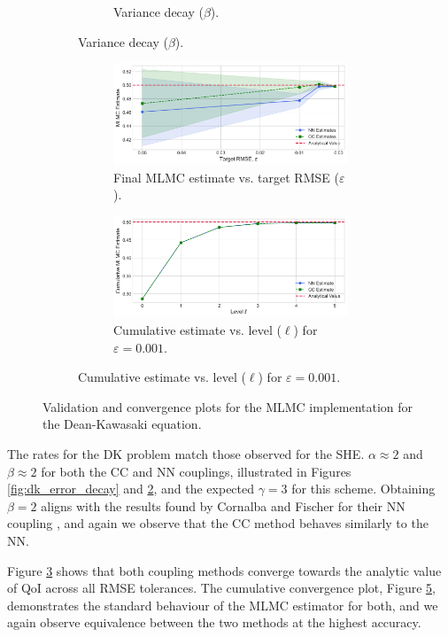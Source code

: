 \begin{figure}[htbp]
\begin{subfigure}{\textwidth}
\begin{subfigure}[b]{0.48\textwidth}
            \caption{Variance decay ($\beta$).}
            \label{fig:dk_variance_decay}
        \end{subfigure}
    \end{subfigure}
    \vspace{1cm}
    \begin{subfigure}{\textwidth}
        \centering
        \begin{subfigure}[b]{\textwidth}
            \centering
            \includegraphics[width=0.7\linewidth]{graphics/dk_conv.png}
            \caption{Final MLMC estimate vs. target RMSE ($\varepsilon$).}
            \label{fig:dk_conv_vs_eps}
        \end{subfigure}
        \vspace{0.5cm}
        \begin{subfigure}[b]{\textwidth}
            \centering
            \includegraphics[width=0.7\linewidth]{graphics/dk_cumconv.png}
            \caption{Cumulative estimate vs. level ($\ell$) for $\varepsilon=0.001$.}
            \label{fig:dk_cumulative_conv}
        \end{subfigure}
    \end{subfigure}
    \caption{Validation and convergence plots for the MLMC implementation for the Dean-Kawasaki equation.}
    \label{fig:dk_validation_combined}
\end{figure}


The rates for the DK problem match those observed for the SHE. 
$\alpha \approx 2$ and $\beta \approx 2$ for both the 
CC and NN couplings, illustrated in Figures 
\ref{fig:dk_error_decay} and \ref{fig:dk_variance_decay}, and the 
expected $\gamma = 3$ for this scheme. Obtaining 
$\beta = 2$ aligns with the results found by Cornalba and Fischer 
for their NN coupling \cite{cornalba2025multilevel}, and again
we observe that the CC method behaves similarly to the NN.

Figure \ref{fig:dk_conv_vs_eps} shows that both coupling methods 
converge towards the analytic value of 
QoI across all RMSE tolerances. The cumulative convergence plot, 
Figure \ref{fig:dk_cumulative_conv}, demonstrates the 
standard behaviour of the MLMC estimator for both, and we again
observe equivalence between the two methods at the highest accuracy.



